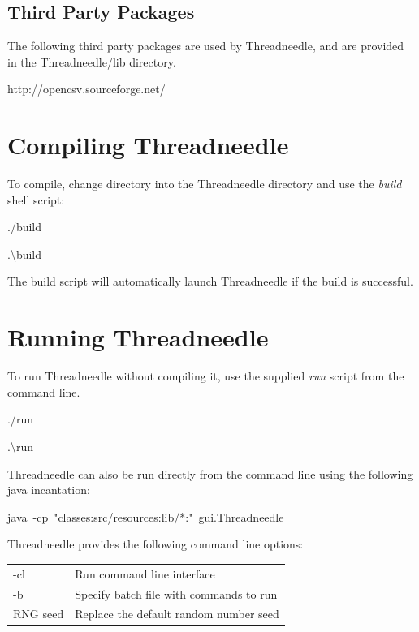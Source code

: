 \documentclass[10pt,oneside,openright, a4paper]{memoir}
\begin{document}
\subsection{Third Party Packages}
The following third party packages are used by Threadneedle, and are provided in the
Threadneedle/lib directory.
\begin{description}[itemindent=3cm, itemsep=1pt]
\item[csvreader]   http://opencsv.sourceforge.net/
\end{description}
\par
\section{Compiling Threadneedle}
To compile, change directory into the Threadneedle directory and use the 
\emph{build} shell script:
\par
\begin{description}[itemindent=3cm]
\item[Linux/OSX\t] ./build
\item[Windows  \t] .\textbackslash build
\end{description}
\par
The build script will automatically launch Threadneedle if the build is
successful. 
%
\section{Running Threadneedle}
To run Threadneedle without compiling it, use the supplied \emph{run} script from the 
command line.
\begin{description}[itemindent=3cm]
\item[Linux/OSX] ./run   
\item[Windows ] .\textbackslash run   
\end{description}
\par
Threadneedle can also be run directly from the command line using the 
following java incantation:
\par
\bigskip
\begin{center}
\mbox{java -cp "classes:src/resources:lib/*:" gui.Threadneedle}
\end{center}
\par
Threadneedle provides the following command line options:          
\begin{table}[ht]
\centering
\begin{tabular}{ll}
-cl  & Run command line interface \\
-b   & Specify batch file with commands to run     \\
RNG seed & Replace the default random number seed  \\
\end{tabular}
\end{table}
%
\end{document}
